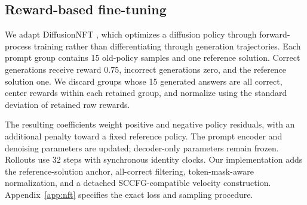 \subsection{Reward-based fine-tuning}
\label{sec:nft}
We adapt DiffusionNFT \citep{diffusionnft}, which optimizes a diffusion policy through forward-process training rather than differentiating through generation trajectories. Each prompt group contains 15 old-policy samples and one reference solution. Correct generations receive reward $0.75$, incorrect generations zero, and the reference solution one. We discard groups whose 15 generated answers are all correct, center rewards within each retained group, and normalize using the standard deviation of retained raw rewards.

The resulting coefficients weight positive and negative policy residuals, with an additional penalty toward a fixed reference policy. The prompt encoder and denoising parameters are updated; decoder-only parameters remain frozen. Rollouts use 32 steps with synchronous identity clocks. Our implementation adds the reference-solution anchor, all-correct filtering, token-mask-aware normalization, and a detached SCCFG-compatible velocity construction. Appendix~\ref{app:nft} specifies the exact loss and sampling procedure.
